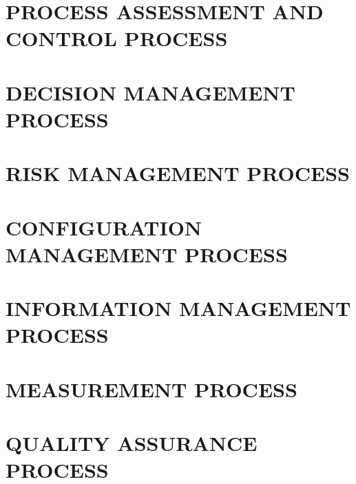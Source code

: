 \documentclass[11pt, twoside, a4paper]{book}
\begin{document}
        \chapter{PROCESS ASSESSMENT AND CONTROL PROCESS}
            
        \chapter{DECISION MANAGEMENT PROCESS}
        
        \chapter{RISK MANAGEMENT PROCESS}
        
        \chapter{CONFIGURATION MANAGEMENT PROCESS}
                
        \chapter{INFORMATION MANAGEMENT PROCESS}
        
        \chapter{MEASUREMENT PROCESS}
        
        \chapter{QUALITY ASSURANCE PROCESS}
    
    
\end{document}
